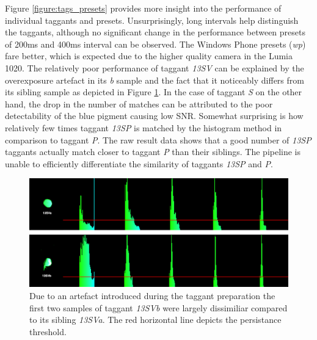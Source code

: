 \documentclass[thesis.tex]{subfiles}
\begin{document}
Figure \ref{figure:tags_presets} provides more insight into the performance of individual taggants and presets. Unsurprisingly, long intervals help distinguish the taggants, although no significant change in the performance between presets of 200ms and 400ms interval can be observed. The Windows Phone presets (\emph{wp}) fare better, which is expected due to the higher quality camera in the Lumia 1020. The relatively poor performance of taggant \emph{13SV} can be explained by the overexposure artefact in its \emph{b} sample and the fact that it noticeably differs from its sibling sample as depicted in Figure \ref{figure:13SV}. In the case of taggant \emph{S} on the other hand, the drop in the number of matches can be attributed to the poor detectability of the blue pigment causing low SNR. Somewhat surprising is how relatively few times taggant \emph{13SP} is matched by the histogram method in comparison to taggant \emph{P}. The raw result data shows that a good number of \emph{13SP} taggants actually match closer to taggant \emph{P} than their siblings. The pipeline is unable to efficiently differentiate the similarity of taggants \emph{13SP} and \emph{P}.

\begin{figure}[h!]
  \centering \includegraphics[page=1,width=\textwidth]{images/findings/13SV}
  \caption{Due to an artefact introduced during the taggant preparation the first two samples of taggant \emph{13SVb} were largely dissimiliar compared to its sibling \emph{13SVa}. The red horizontal line depicts the persistance threshold.}
  \label{figure:13SV}
\end{figure}
\end{document}
